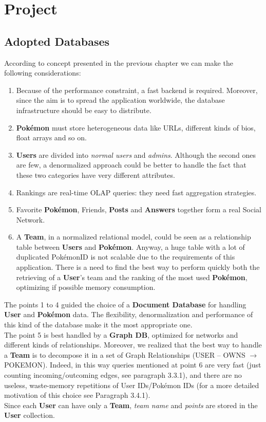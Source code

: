 \section{Project}
\subsection{Adopted Databases}
According to concept presented in the previous chapter we can make the following considerations:
\begin{enumerate}
\item Because of the performance constraint, a fast backend is required. Moreover, since the aim is to spread the application worldwide, the database infrastructure should be easy to distribute.
\item \textbf{Pokémon} must store heterogeneous data like URLs, different kinds of bios, float arrays and so on.
\item \textbf{Users} are divided into \textit{normal users} and \textit{admins}. Although the second ones are few, a denormalized approach could be better to handle the fact that these two categories have very different attributes.
\item Rankings are real-time OLAP queries: they need fast aggregation strategies.
\item Favorite \textbf{Pokémon}, Friends, \textbf{Posts} and \textbf{Answers} together form a real Social Network.
\item A \textbf{Team}, in a normalized relational model, could be seen as a relationship table between \textbf{Users} and \textbf{Pokémon}. Anyway, a huge table with a lot of duplicated PokémonID is not scalable due to the requirements of this application. There is a need to find the best way to perform quickly both the retrieving of a \textbf{User}’s team and the ranking of the most used \textbf{Pokémon}, optimizing if possible memory consumption.
\end{enumerate}

The points 1 to 4 guided the choice of a \textbf{Document Database} for handling \textbf{User} and \textbf{Pokémon} data. The flexibility, denormalization and performance of this kind of the database make it the most appropriate one.\medspace \\

The point 5 is best handled by a \textbf{Graph DB}, optimized for networks and different kinds of relationships. Moreover, we realized that the best way to handle a \textbf{Team} is to decompose it in a set of Graph Relationships (USER – OWNS $\rightarrow$ POKEMON).  Indeed, in this way queries mentioned at point 6 are very fast (just counting incoming/outcoming edges, see paragraph 3.3.1), and there are no useless, waste-memory repetitions of User IDs/Pokémon IDs (for a more detailed motivation of this choice see Paragraph 3.4.1). \\
Since each \textbf{User} can have only a \textbf{Team}, \textit{team name} and \textit{points} are stored in the \textbf{User} collection.



